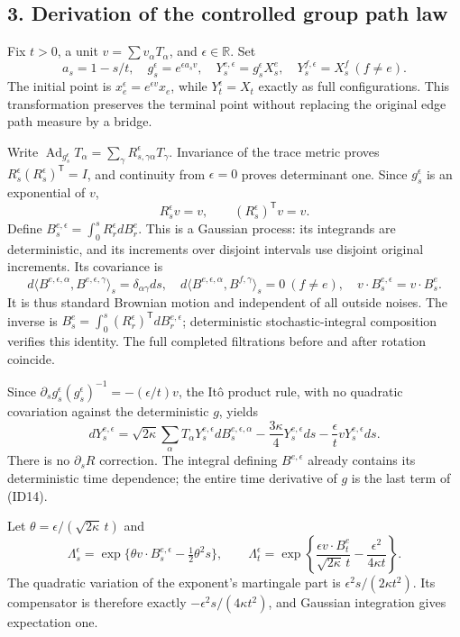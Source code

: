 \documentclass[11pt]{article}
\begin{document}
\subsection*{3. Derivation of the controlled group path law}

Fix \(t>0\), a unit \(v=\sum v_\alpha T_\alpha\), and \(\epsilon\in\mathbb R\). Set
\[
 a_s=1-s/t,\quad g_s^\epsilon=e^{\epsilon a_sv},\quad
 Y_s^{e,\epsilon}=g_s^\epsilon X_s^e,\quad
 Y_s^{f,\epsilon}=X_s^f\ (f\ne e).
 \tag{ID11}
\]
The initial point is \(x_e^\epsilon=e^{\epsilon v}x_e\), while \(Y_t^\epsilon=X_t\) exactly as full configurations. This transformation preserves the terminal point without replacing the original edge path measure by a bridge.

Write \(\operatorname{Ad}_{g_s^\epsilon}T_\alpha=\sum_\gamma R_{s,\gamma\alpha}^\epsilon T_\gamma\). Invariance of the trace metric proves \(R_s^\epsilon(R_s^\epsilon)^{\mathsf T}=I\), and continuity from \(\epsilon=0\) proves determinant one. Since \(g_s^\epsilon\) is an exponential of \(v\),
\[
 R_s^\epsilon v=v,\qquad (R_s^\epsilon)^{\mathsf T}v=v.
 \tag{ID12}
\]
Define \(B_s^{e,\epsilon}=\int_0^sR_r^\epsilon dB_r^e\). This is a Gaussian process: its integrands are deterministic, and its increments over disjoint intervals use disjoint original increments. Its covariance is
\[
 d\langle B^{e,\epsilon,\alpha},B^{e,\epsilon,\gamma}\rangle_s
 =\delta_{\alpha\gamma}ds,\quad
 d\langle B^{e,\epsilon,\alpha},B^{f,\gamma}\rangle_s=0\ (f\ne e),
 \quad v\cdot B_s^{e,\epsilon}=v\cdot B_s^e.
 \tag{ID13}
\]
It is thus standard Brownian motion and independent of all outside noises. The inverse is \(B_s^e=\int_0^s(R_r^\epsilon)^{\mathsf T}dB_r^{e,\epsilon}\); deterministic stochastic-integral composition verifies this identity. The full completed filtrations before and after rotation coincide.

Since \(\partial_sg_s^\epsilon(g_s^\epsilon)^{-1}=-(\epsilon/t)v\), the Itô product rule, with no quadratic covariation against the deterministic \(g\), yields
\[
 dY_s^{e,\epsilon}
 =\sqrt{2\kappa}\sum_\alpha T_\alpha Y_s^{e,\epsilon}dB_s^{e,\epsilon,\alpha}
   -\frac{3\kappa}{4}Y_s^{e,\epsilon}ds
   -\frac\epsilon t vY_s^{e,\epsilon}ds.
 \tag{ID14}
\]
There is no \(\partial_sR\) correction. The integral defining \(B^{e,\epsilon}\) already contains its deterministic time dependence; the entire time derivative of \(g\) is the last term of (ID14).

Let \(\theta=\epsilon/(\sqrt{2\kappa}\,t)\) and
\[
 \Lambda_s^\epsilon
 =\exp\{\theta v\cdot B_s^{e,\epsilon}-\tfrac12\theta^2s\},\qquad
 \Lambda_t^\epsilon
 =\exp\left\{\frac{\epsilon v\cdot B_t^e}{\sqrt{2\kappa}\,t}
                      -\frac{\epsilon^2}{4\kappa t}\right\}.
 \tag{ID15}
\]
The quadratic variation of the exponent's martingale part is \(\epsilon^2s/(2\kappa t^2)\). Its compensator is therefore exactly \(-\epsilon^2s/(4\kappa t^2)\), and Gaussian integration gives expectation one.
\end{document}
